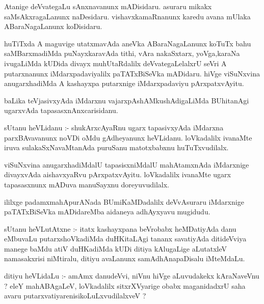 \documentclass{article}
\begin{document}
\begin{mn}
Atanige deVvategaLu sAnxnavanunx mADisidaru. asuraru mikakx saMsAkxragaLanunx 
naDesidaru. vishavxkamaRnanunx karedu avana mUlaka ABaraNagaLanunx koDisidaru.
\end{mn}

\begin{mn}
huTiTxda A maguvige utatxmavAda aneVka ABaraNagaLanunx koTuTx bahu 
saMBarxmadiMda puNayxkaravAda tithi, vAra nakaSxtarx, yoVga,karaNa 
ivugaLiMda kUDida divayx muhUtaRdalilx deVvategaLelalxrU seVri A 
putarxnanunx iMdarxpadaviyalilx paTATxBiSeVka mADidaru. hiVge viSuNxvina
anugarxhadiMda  A kashayxpa putarxnige iMdarxpadaviyu pArxpatxvAyitu.
\end{mn}

\begin{mn}
baLika teVjasivxyAda iMdarxnu vajarxpAshAMkushAdigaLiMda BUhitanAgi 
ugarxvAda tapasasxnAnxcarisidanu.
\end{mn}

\begin{mn}
sUtanu heVLidanu :- shukArxcAyaRnu ugarx tapasivxyAda iMdarxna 
parxBAvavanunx noVDi oMdu gAdheyanunx heVLidanu. loVkadalilx ivanaMte 
iruva sulakaSxNavaMtanAda puruSanu matotxbabxnu huTuTxvudilalx.
\end{mn}

\begin{mn}
viSuNxvina anugarxhadiMdalU tapasisxniMdalU mahAtamxnAda iMdarxnige
divayxvAda aishavxyaRvu pArxpatxvAyitu. loVkadalilx ivanaMte ugarx tapasasxnunx
mADuva manuSayxnu doreyuvudilalx.                  
\end{mn}

\begin{mn}
ililxge padamxmahApurANada BUmiKaMDadalilx deVvAsuraru iMdarxnige 
paTATxBiSeVka mADidareMba aidaneya adhAyxyavu mugidudu.
\end{mn}




\begin{mn}
sUtanu heVLutAtxne :- itatx kashayxpana beVrobabx heMDatiyAda  danu eMbuvaLu
putarxshoVkadiMda duHKitaLAgi  tananx savatiyAda ditideVviya manege baMdu 
atiV duHKadiMda kUDi ditiya kAlugaLige  aLutatxleV namasakxrisi niMtiralu, 
ditiyu avaLanunx samAdhAnapaDisalu iMteMdaLu.
\end{mn}

\begin{mn}
ditiyu heVLidaLu :- amAmx danudeVvi, niVnu hiVge aLuvudakekx kAraNaveVnu ?
eleY mahABAgaLeV, loVkadalilx sitxrXVyarige obabx maganidadxrU saha avaru
putarxvatiyarenisikoLuLxvudilalxveV ? 
\end{mn}
\end{document}
